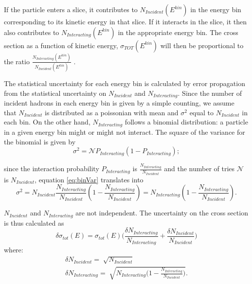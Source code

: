 If the particle enters a slice, it contributes to $N_{Incident}( E^{kin})$ in the energy bin corresponding to its kinetic energy in that slice. If it interacts in the slice, it then also contributes to $N_{Interacting}(E^{kin})$ in the appropriate energy bin. The cross section as a function of kinetic energy, $\sigma_{TOT}( E^{kin})$ will then be proportional to the ratio $\frac{N_{Interacting}( E^{kin})}{N_{Incident}( E^{kin})}$ .


The statistical uncertainty for each energy bin is calculated by error propagation from the statistical  uncertainty on $N_{Incident}$ and $N_{Interacting}$. 
Since the number of incident hadrons in each energy bin is given by a simple counting, we assume that $N_{Incident}$ is distributed as a poissonian with mean and $\sigma^2$ equal to $N_{Incident}$ in each bin.  
On the other hand, $N_{Interacting}$ follows a binomial distribution: a particle in a given energy bin might or might not interact.  The square of the variance for the binomial is given by  
\begin{equation}
\sigma^2 = \mathcal{N}P_{Interacting}(1-P_{Interacting});
\label{eq:binVar}
\end{equation}

since the interaction probability $P_{Interacting}$ is $\frac{ N_{Interacting}}{N_{Incident}}$ and the number of tries $\mathcal{N}$ is $N_{Incident}$, equation \ref{eq:binVar} translates into
\begin{equation}
\sigma^2 = N_{Incident}\frac{ N_{Interacting}}{N_{Incident}} (1-\frac{ N_{Interacting}}{N_{Incident}}) = N_{Interacting}(1-\frac{ N_{Interacting}}{N_{Incident}}).
\end{equation}

$N_{Incident}$ and $N_{Interacting}$ are not independent.
The uncertainty on the cross section is thus calculated as 
\begin{equation}
\delta\sigma_{tot}(E) = \sigma_{tot}(E) \Big(\frac{\delta N_{Interacting}}{N_{Interacting}}+\frac{\delta N_{Incident}}{N_{Incident}}\Big) 
\end{equation}
where:
\begin{eqnarray}
\delta N_{Incident} = \sqrt[]{N_{Incident}} \\
\delta N_{Interacting} = \sqrt[]{N_{Interacting}\Big(1-\frac{ N_{Interacting}}{N_{Incident}}\Big)}.
\end{eqnarray}





